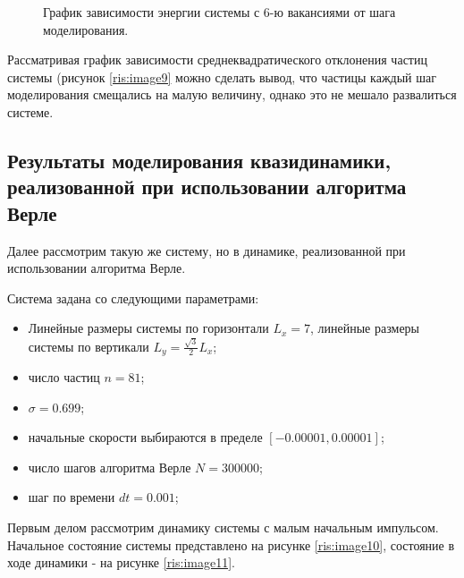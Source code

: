 \documentclass[14pt,a4paper,report]{ncc}
\begin{document}
\begin{figure}[h!]
\caption{График зависимости энергии системы с 6-ю вакансиями от шага моделирования.}
\label{ris:image8}
\end{figure}
Рассматривая график зависимости среднеквадратического отклонения частиц системы (рисунок \ref{ris:image9} можно сделать вывод, что частицы каждый шаг моделирования смещались на малую величину, однако это не мешало развалиться системе. 



\newpage
\subsection{Результаты моделирования квазидинамики, реализованной при использовании алгоритма Верле}
Далее рассмотрим такую же систему, но в динамике, реализованной при использовании алгоритма Верле.
\

Система задана со следующими параметрами:
\begin{itemize}
\item Линейные размеры системы по горизонтали $L_x=7$, линейные размеры системы по вертикали $L_y=\frac{\sqrt{3}}{2}L_x$;
\item число частиц $n=81$;
\item $\sigma=0.699$;
\item начальные скорости выбираются в пределе $ [-0.00001,0.00001]$;
\item число шагов алгоритма Верле  $N=300000$;
\item шаг по времени $dt=0.001$;
\end{itemize}

Первым делом рассмотрим динамику системы с малым начальным импульсом.
Начальное состояние системы представлено на рисунке \ref{ris:image10}, состояние в ходе динамики - на рисунке \ref{ris:image11}. 
\
\end{document}
